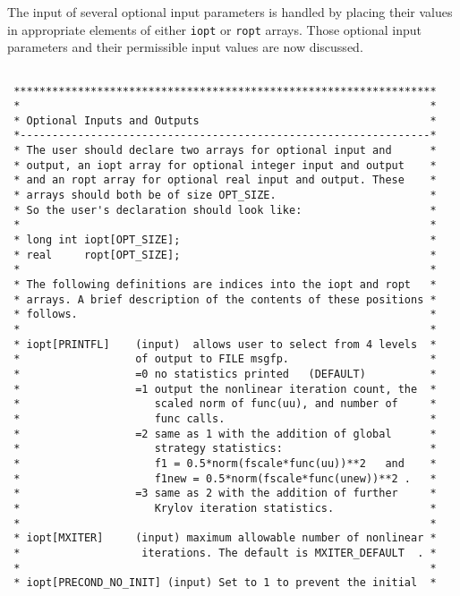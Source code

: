 \documentclass[11pt]{article}
\begin{document}
The input of several optional input parameters is handled by placing
their values in appropriate elements of either {\tt iopt} or {\tt ropt} arrays.
Those optional input parameters and their permissible input values are now
discussed.
\small
\begin{verbatim}

 ******************************************************************
 *                                                                *
 * Optional Inputs and Outputs                                    *
 *----------------------------------------------------------------*
 * The user should declare two arrays for optional input and      *
 * output, an iopt array for optional integer input and output    *
 * and an ropt array for optional real input and output. These    *
 * arrays should both be of size OPT_SIZE.                        *
 * So the user's declaration should look like:                    *
 *                                                                *
 * long int iopt[OPT_SIZE];                                       *
 * real     ropt[OPT_SIZE];                                       *
 *                                                                *
 * The following definitions are indices into the iopt and ropt   *
 * arrays. A brief description of the contents of these positions *
 * follows.                                                       *
 *                                                                *
 * iopt[PRINTFL]    (input)  allows user to select from 4 levels  *
 *                  of output to FILE msgfp.                      *
 *                  =0 no statistics printed   (DEFAULT)          *
 *                  =1 output the nonlinear iteration count, the  *
 *                     scaled norm of func(uu), and number of     *
 *                     func calls.                                *
 *                  =2 same as 1 with the addition of global      *
 *                     strategy statistics:                       *
 *                     f1 = 0.5*norm(fscale*func(uu))**2   and    *
 *                     f1new = 0.5*norm(fscale*func(unew))**2 .   *
 *                  =3 same as 2 with the addition of further     *
 *                     Krylov iteration statistics.               *
 *                                                                *
 * iopt[MXITER]     (input) maximum allowable number of nonlinear *
 *                   iterations. The default is MXITER_DEFAULT  . *
 *                                                                *
 * iopt[PRECOND_NO_INIT] (input) Set to 1 to prevent the initial  *

\end{verbatim}
\end{document}
